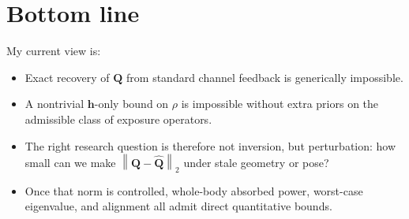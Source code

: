 \documentclass[11pt]{article}
\newcommand{\hh}{\mathbf{h}}
\newcommand{\QQ}{\mathbf{Q}}
\newcommand{\norm}[1]{\left\lVert #1 \right\rVert}
\begin{document}
\section*{Bottom line}

My current view is:
\begin{itemize}
  \item Exact recovery of $\QQ$ from standard channel feedback is generically
  impossible.
  \item A nontrivial $\hh$-only bound on $\rho$ is impossible without extra
  priors on the admissible class of exposure operators.
  \item The right research question is therefore not inversion, but
  perturbation: how small can we make $\norm{\QQ-\widehat{\QQ}}_2$ under
  stale geometry or pose?
  \item Once that norm is controlled, whole-body absorbed power, worst-case
  eigenvalue, and alignment all admit direct quantitative bounds.
\end{itemize}
\end{document}
